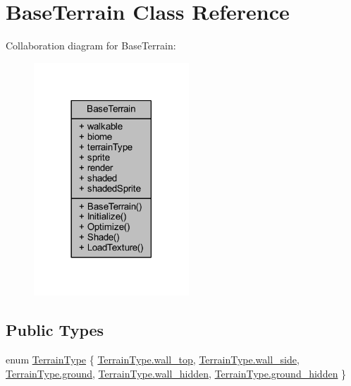 \hypertarget{class_base_terrain}{}\section{Base\+Terrain Class Reference}
\label{class_base_terrain}


Collaboration diagram for Base\+Terrain\+:\nopagebreak
\begin{figure}[H]
\begin{center}
\leavevmode
\includegraphics[width=165pt]{class_base_terrain__coll__graph}
\end{center}
\end{figure}
\subsection*{Public Types}
\begin{DoxyCompactItemize}
\item 
enum \mbox{\hyperlink{class_base_terrain_a5b782f4de5e1a2ca1343b4aa89a7dc9a}{Terrain\+Type}} \{ \newline
\mbox{\hyperlink{class_base_terrain_a5b782f4de5e1a2ca1343b4aa89a7dc9aaffe15f42468128e48325cf9206ab42e8}{Terrain\+Type.\+wall\+\_\+top}}, 
\mbox{\hyperlink{class_base_terrain_a5b782f4de5e1a2ca1343b4aa89a7dc9aa3efe6e3a4e45b10c24fca4149a87a786}{Terrain\+Type.\+wall\+\_\+side}}, 
\mbox{\hyperlink{class_base_terrain_a5b782f4de5e1a2ca1343b4aa89a7dc9aa578552719239a72a2d45ad422f67d24d}{Terrain\+Type.\+ground}}, 
\mbox{\hyperlink{class_base_terrain_a5b782f4de5e1a2ca1343b4aa89a7dc9aafc32e3a8457bbaec473b09d4462c1ecd}{Terrain\+Type.\+wall\+\_\+hidden}}, 
\newline
\mbox{\hyperlink{class_base_terrain_a5b782f4de5e1a2ca1343b4aa89a7dc9aa8630ecda1c772caaa8625ab886c66db8}{Terrain\+Type.\+ground\+\_\+hidden}}
 \}
\end{DoxyCompactItemize}
